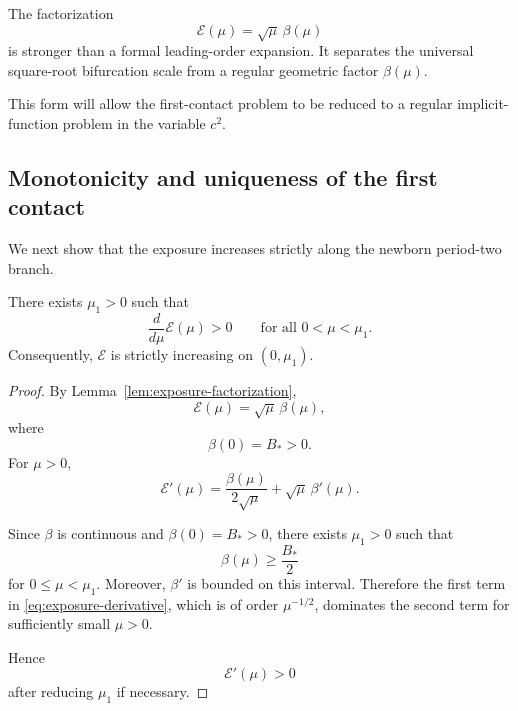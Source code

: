 \begin{remark}
\label{rem:exposure-factorization-importance}
The factorization
\[
\mathscr E(\mu)
=
\sqrt{\mu}\,\beta(\mu)
\]
is stronger than a formal leading-order expansion.
It separates the universal square-root bifurcation scale from a
regular geometric factor $\beta(\mu)$.

This form will allow the first-contact problem to be reduced to a
regular implicit-function problem in the variable $c^2$.
\end{remark}

\subsection{Monotonicity and uniqueness of the first contact}
\label{subsec:contact-uniqueness}

We next show that the exposure increases strictly along the newborn
period-two branch.

\begin{proposition}
\label{prop:exposure-monotonicity}
There exists $\mu_1>0$ such that
\begin{equation}
\frac{d}{d\mu}\mathscr E(\mu)>0
\qquad
\text{for all }
0<\mu<\mu_1.
\label{eq:exposure-monotonicity}
\end{equation}
Consequently, $\mathscr E$ is strictly increasing on
$(0,\mu_1)$.
\end{proposition}

\begin{proof}
By Lemma~\ref{lem:exposure-factorization},
\[
\mathscr E(\mu)
=
\sqrt{\mu}\,\beta(\mu),
\]
where
\[
\beta(0)=B_*>0.
\]
For $\mu>0$,
\begin{equation}
\mathscr E'(\mu)
=
\frac{\beta(\mu)}{2\sqrt{\mu}}
+
\sqrt{\mu}\,\beta'(\mu).
\label{eq:exposure-derivative}
\end{equation}

Since $\beta$ is continuous and $\beta(0)=B_*>0$, there exists
$\mu_1>0$ such that
\[
\beta(\mu)\geq\frac{B_*}{2}
\]
for $0\leq\mu<\mu_1$.
Moreover, $\beta'$ is bounded on this interval. Therefore the first
term in \eqref{eq:exposure-derivative}, which is of order
$\mu^{-1/2}$, dominates the second term for sufficiently small
$\mu>0$.

Hence
\[
\mathscr E'(\mu)>0
\]
after reducing $\mu_1$ if necessary.
\end{proof}

